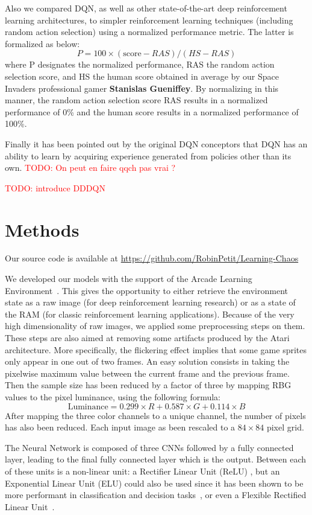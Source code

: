\documentclass[letterpaper]{article}
\newcommand\todo[1]{\textcolor{red}{TODO: #1}}
\begin{document}
Also we compared DQN, as well as other state-of-the-art deep reinforcement learning architectures, to simpler reinforcement learning techniques (including
random action selection) using a normalized performance metric. The latter is formalized as below:
\[
    P = 100 \times (\text{score} - RAS) / (HS - RAS)
\]
where P designates the normalized performance, RAS the random action selection score, and HS the human score obtained in average by our
Space Invaders professional gamer \textbf{Stanislas Gueniffey}. By normalizing in this manner, the random action selection score RAS results in
a normalized performance of 0\% and the human score results in a normalized performance of 100\%.

Finally it has been pointed out by the original DQN conceptors that DQN has an ability to learn by acquiring experience generated from policies
other than its own. \todo{On peut en faire qqch pas vrai ?}

\todo{introduce DDDQN}

\section{Methods}

Our source code is available at \url{https://github.com/RobinPetit/Learning-Chaos}

We developed our models with the support of the Arcade Learning Environment~\citep{bellemare13arcade}. This gives the opportunity to either
retrieve the environment state as a raw image (for deep reinforcement learning research) or as a state of the RAM (for classic reinforcement learning
applications). Because of the very high dimensionality of raw images, we applied some preprocessing steps on them. These steps are also aimed at
removing some artifacts produced by the Atari architecture. More specifically, the flickering effect implies that some game sprites only appear
in one out of two frames. An easy solution consists in taking the pixelwise maximum value between the current frame and the previous frame.
Then the sample size has been reduced by a factor of three by mapping RBG values to the pixel luminance, using the following formula:
\[
    \text{Luminance} = 0.299 \times R + 0.587 \times G + 0.114 \times B
\]
After mapping the three color channels to a unique channel, the number of pixels has also been reduced. Each input image as been rescaled to a
$84 \times 84$ pixel grid.

The Neural Network is composed of three CNNs followed by a fully connected layer, leading to the final fully connected layer which is the output.
Between each of these units is a non-linear unit: a Rectifier Linear Unit (ReLU) \citep{krizhevsky2012imagenet}, but an Exponential Linear Unit (ELU) could
also be used since it has been shown to be more performant in classification and decision tasks~\citep{DBLP:journals/corr/ClevertUH15}, or even a
Flexible Rectified Linear Unit~\citep{qiu2017flexible}.
\end{document}
